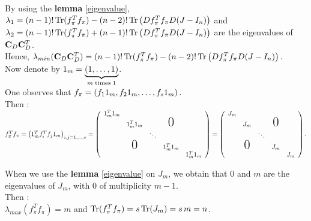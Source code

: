 \begin{itemize}
    By using the \textbf{lemma} \ref{eigenvalue}, $\lambda_{1} = (n-1)!\operatorname{Tr}(f_{\pi}^{T} f_{\pi}) -(n-2)! \operatorname{Tr}\left(D f_{\pi}^{T} f_{\pi} D (J-I_{n}) \right)     $ and \\$\lambda_{2} = (n-1)!\operatorname{Tr}(f_{\pi}^{T} f_{\pi})+(n-1)!\operatorname{Tr}\left(D f_{\pi}^{T} f_{\pi} D (J-I_{n}) \right) $ are the eigenvalues of $\bold{C}_{D} \bold{C}_{D}^{T} $.\\
    Hence, $\lambda_{min}( \bold{C}_{D} \bold{C}_{D}^{T} ) = (n-1)!\operatorname{Tr}(f_{\pi}^{T} f_{\pi}) -(n-2)! \operatorname{Tr}\left(D f_{\pi}^{T} f_{\pi} D (J-I_{n}) \right).$\\
    
    Now denote by $1_{m} = \underbrace{\left(1,\dots,1\right)}_{m \;\text{times}\; 1}$.\\
    One observes that  $f_{\pi} = \left(f_{1}1_{m}, f_{2}1_{m}, \dots, f_{s}1_{m}\right).$\\
    
    
Then :\\
$f_{\pi}^{T} f_{\pi} = \pare{1_{m}^{T}f_{i}^{T}f_{j}1_{m}}_{i,j=1,\dots,s} =    \left(
    \begin{array}{ccccc}
    1_{m}^{T}1_{m}                                   \\
      & 1_{m}^{T}1_{m}              &   & \text{\huge0}\\
      &               & \ddots               \\
      & \text{\huge0} &   & 1_{m}^{T}1_{m}            \\
      &               &   &   & 1_{m}^{T}1_{m} 
    \end{array}
    \right) = \left(
    \begin{array}{ccccc}
    J_{m}                                 \\
      & J_{m}              &   & \text{\huge0}\\
      &               & \ddots               \\
      & \text{\huge0} &   & J_{m}          \\
      &               &   &   & J_{m}
    \end{array}
    \right).$
    
    When we use the \textbf{lemma} \ref{eigenvalue} on $J_{m}$, we obtain that $0$ and $m$ are the eigenvalues of $J_{m}$, with $0$ of multiplicity $m-1$.\\
Then :\\
$\lambda_{max}(f_{\pi}^{T}f_{\pi}) = m$ and $\operatorname{Tr}(f_{\pi}^{T} f_{\pi}) = s \operatorname{Tr}(J_{m}) = s\, m = n$.\\


\end{itemize}
